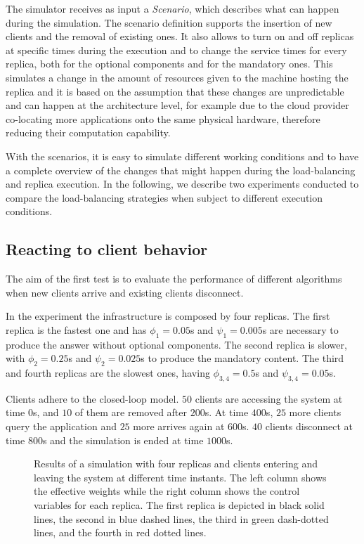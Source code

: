 The simulator receives as input a \emph{Scenario}, which describes
what can happen during the simulation. The scenario definition
supports the insertion of new clients and the removal of existing
ones. It also allows to turn on and off replicas at specific times
during the execution and to change the service times for every
replica, both for the optional components and for the mandatory
ones. This simulates a change in the amount of resources given to the
machine hosting the replica and it is based on the assumption that
these changes are unpredictable and can happen at the architecture
level, for example due to the cloud provider co-locating more
applications onto the same physical hardware, therefore reducing their
computation capability.

With the scenarios, it is easy to simulate different working
conditions and to have a complete overview of the changes that might
happen during the load-balancing and replica execution. In the
following, we describe two experiments conducted to compare the
load-balancing strategies when subject to different execution
conditions.

\subsection{Reacting to client behavior}

The aim of the first test is to evaluate the performance of different
algorithms when new clients arrive and existing clients disconnect.

In the experiment the infrastructure is composed by four replicas. The
first replica is the fastest one and has $\phi_1 = 0.05$s and $\psi_1
= 0.005$s are necessary to produce the answer without optional
components. The second replica is slower, with $\phi_2 = 0.25$s and
$\psi_2 = 0.025$s to produce the mandatory content. The third and
fourth replicas are the slowest ones, having $\phi_{3,4} = 0.5$s and
$\psi_{3,4} = 0.05$s.

Clients adhere to the closed-loop model. $50$ clients are accessing
the system at time $0$s, and $10$ of them are removed after $200$s. At
time $400$s, $25$ more clients query the application and $25$ more
arrives again at $600$s. $40$ clients disconnect at time $800$s and
the simulation is ended at time $1000$s.

\begin{figure}[t!]
  \centering 
  \caption{Results of a simulation with four replicas and clients
    entering and leaving the system at different time instants. The
    left column shows the effective weights while the right column
    shows the control variables for each replica. The first replica is
    depicted in black solid lines, the second in blue dashed lines,
    the third in green dash-dotted lines, and the fourth in red dotted
    lines.}
    \vspace{-8mm}
\label{fig:clientchanges-full}
\end{figure}

